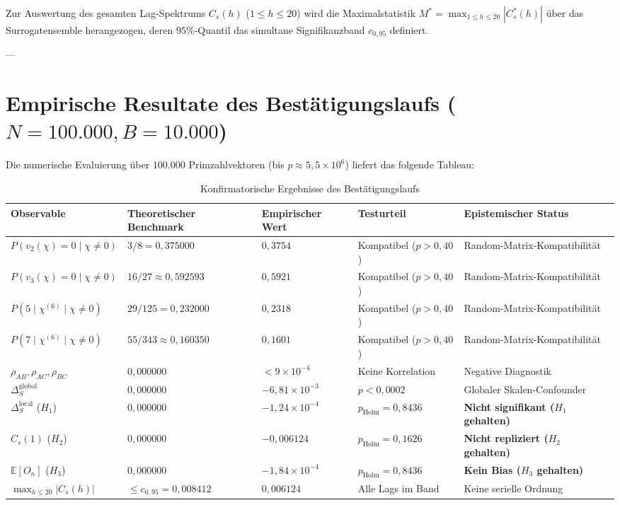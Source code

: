 \documentclass[11pt,a4paper]{article}
\theoremstyle{plain}
\theoremstyle{definition}
\theoremstyle{remark}
\begin{document}
Zur Auswertung des gesamten Lag-Spektrums $C_s(h)$ ($1 \le h \le 20$) wird die Maximalstatistik $M^* = \max_{1 \le h \le 20} |C_s^*(h)|$ über das Surrogatensemble herangezogen, deren $95\%$-Quantil das simultane Signifikanzband $c_{0{,}95}$ definiert.

---

\section{Empirische Resultate des Bestätigungslaufs ($N=100.000, B=10.000$)}

Die numerische Evaluierung über $100.000$ Primzahlvektoren (bis $p \approx 5{,}5 \times 10^6$) liefert das folgende Tableau:

\begin{table}[h]
\centering
\small
\caption{Konfirmatorische Ergebnisse des Bestätigungslaufs}
\begin{tabular}{lllll}
\toprule
Observable & Theoretischer Benchmark & Empirischer Wert & Testurteil & Epistemischer Status \\
\midrule
$P(v_2(\chi)=0 \mid \chi \neq 0)$ & $3/8 = 0{,}375000$ & $0{,}3754$ & Kompatibel ($p > 0{,}40$) & Random-Matrix-Kompatibilität \\
$P(v_3(\chi)=0 \mid \chi \neq 0)$ & $16/27 \approx 0{,}592593$ & $0{,}5921$ & Kompatibel ($p > 0{,}40$) & Random-Matrix-Kompatibilität \\
$P(5 \mid \chi^{(6)} \mid \chi \neq 0)$ & $29/125 = 0{,}232000$ & $0{,}2318$ & Kompatibel ($p > 0{,}40$) & Random-Matrix-Kompatibilität \\
$P(7 \mid \chi^{(6)} \mid \chi \neq 0)$ & $55/343 \approx 0{,}160350$ & $0{,}1601$ & Kompatibel ($p > 0{,}40$) & Random-Matrix-Kompatibilität \\
\midrule
$\rho_{AB}, \rho_{AC}, \rho_{BC}$ & $0{,}000000$ & $< 9 \times 10^{-4}$ & Keine Korrelation & Negative Diagnostik \\
$\Delta_S^{\mathrm{global}}$ & $0{,}000000$ & $-6{,}81 \times 10^{-3}$ & $p < 0{,}0002$ & Globaler Skalen-Confounder \\
$\Delta_S^{\mathrm{local}}$ ($H_1$) & $0{,}000000$ & $-1{,}24 \times 10^{-4}$ & $p_{\mathrm{Holm}} = 0{,}8436$ & \textbf{Nicht signifikant ($H_1$ gehalten)} \\
$C_s(1)$ ($H_2$) & $0{,}000000$ & $-0{,}006124$ & $p_{\mathrm{Holm}} = 0{,}1626$ & \textbf{Nicht repliziert ($H_2$ gehalten)} \\
$\mathbb{E}[O_n]$ ($H_3$) & $0{,}000000$ & $-1{,}84 \times 10^{-4}$ & $p_{\mathrm{Holm}} = 0{,}8436$ & \textbf{Kein Bias ($H_3$ gehalten)} \\
\midrule
$\max_{h \le 20} |C_s(h)|$ & $\le c_{0{,}95} = 0{,}008412$ & $0{,}006124$ & Alle Lags im Band & Keine serielle Ordnung \\
\bottomrule
\end{tabular}
\end{table}
\end{document}
